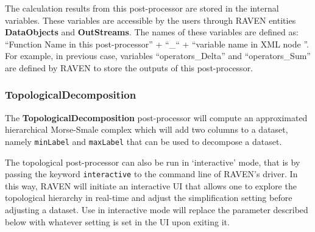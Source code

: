 \nb The calculation results from this post-processor are stored in the internal variables. These variables
are accessible by the users through RAVEN entities \textbf{DataObjects} and \textbf{OutStreams}. The names
of these variables are defined as: ``Function Name in this post-processor'' + ``\_`` + ``variable name in XML
node ''. For example, in previous case, variables ``operators\_Delta'' and ``operators\_Sum''
are defined by RAVEN to store the outputs of this post-processor.

\subsubsection{TopologicalDecomposition}
\label{TopologicalDecomposition}
The \textbf{TopologicalDecomposition} post-processor will compute an
approximated hierarchical Morse-Smale complex which will add two columns to a
dataset, namely \texttt{minLabel} and \texttt{maxLabel} that can be used to
decompose a dataset.
%

The topological post-processor can also be run in `interactive' mode, that is
by passing the keyword \texttt{interactive} to the command line of RAVEN's
driver.
%
In this way, RAVEN will initiate an interactive UI that allows one to explore
the topological hierarchy in real-time and adjust the simplification setting
before adjusting a dataset. Use in interactive mode will replace the parameter
 described below with whatever setting is set in the UI
upon exiting it.

